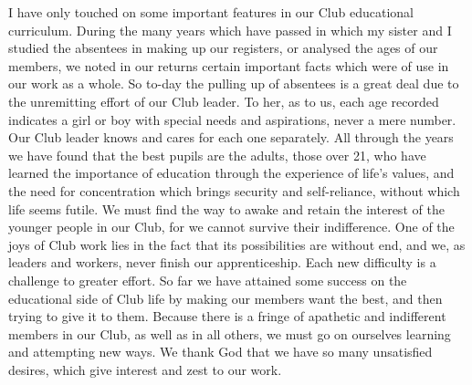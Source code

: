 I have only touched on some important features in
our Club educational curriculum. During the many years
which have passed in which my sister and I studied the
absentees in making up our registers, or analysed the ages
of our members, we noted in our returns certain important
facts which were of use in our work as a whole. So
to-day the pulling up of absentees is a great deal due to
the unremitting effort of our Club leader. To her, as to
us, each age recorded indicates a girl or boy with special
needs and aspirations, never a mere number. Our Club
leader knows and cares for each one separately. All
through the years we have found that the best pupils are
the adults, those over 21, who have learned the importance
of education through the experience of life’s values,
and the need for concentration which brings security and
self-reliance, without which life seems futile. We must
find the way to awake and retain the interest of the
younger people in our Club, for we cannot survive their
indifference. One of the joys of Club work lies in the fact
that its possibilities are without end, and we, as leaders
and workers, never finish our apprenticeship. Each new
difficulty is a challenge to greater effort. So far we have
attained some success on the educational side of Club life
by making our members want the best, and then trying
to give it to them. Because there is a fringe of apathetic
and indifferent members in our Club, as well as in all
others, we must go on ourselves learning and attempting
new ways. We thank God that we have so many unsatisfied desires, which give interest and zest to our work.
